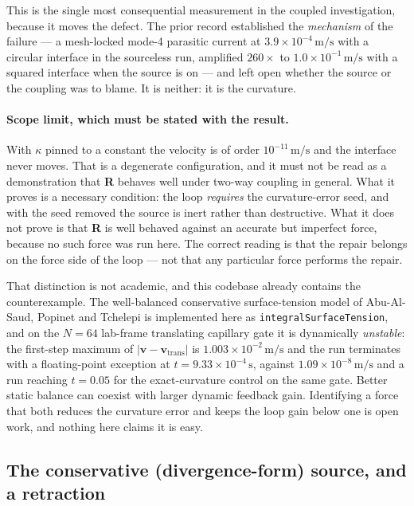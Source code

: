 \documentclass[preprint,3p,11pt]{elsarticle}
\begin{document}
This is the single most consequential measurement in the coupled investigation,
because it moves the defect. The prior record established the \emph{mechanism} of
the failure --- a mesh-locked mode-4 parasitic current at
$3.9\times10^{-4}\,\mathrm{m/s}$ with a circular interface in the sourceless run,
amplified $260\times$ to $1.0\times10^{-1}\,\mathrm{m/s}$ with a squared
interface when the source is on --- and left open whether the source or the
coupling was to blame. It is neither: it is the curvature.

\paragraph{Scope limit, which must be stated with the result.} With $\kappa$
pinned to a constant the velocity is of order $10^{-11}\,\mathrm{m/s}$ and the
interface never moves. That is a degenerate configuration, and it must not be
read as a demonstration that \textbf{R} behaves well under two-way coupling in
general. What it proves is a necessary condition: the loop \emph{requires} the
curvature-error seed, and with the seed removed the source is inert rather than
destructive. What it does not prove is that \textbf{R} is well behaved against an
accurate but imperfect force, because no such force was run here. The correct
reading is that the repair belongs on the force side of the loop --- not that any
particular force performs the repair.

That distinction is not academic, and this codebase already contains the
counterexample. The well-balanced conservative surface-tension model of
Abu-Al-Saud, Popinet and Tchelepi \cite{abualsaud2018} is implemented here as
\texttt{integralSurfaceTension}, and on the $N=64$ lab-frame translating
capillary gate it is dynamically \emph{unstable}: the first-step maximum of
$|\mathbf{v} - \mathbf{v}_{\mathrm{trans}}|$ is
$1.003\times10^{-2}\,\mathrm{m/s}$ and the run terminates with a
floating-point exception at $t = 9.33\times10^{-4}\,\mathrm{s}$, against
$1.09\times10^{-8}\,\mathrm{m/s}$ and a run reaching $t=0.05$ for the
exact-curvature control on the same gate. Better static balance can coexist with
larger dynamic feedback gain. Identifying a force that both reduces the curvature
error and keeps the loop gain below one is open work, and nothing here claims it
is easy.

\subsection{The conservative (divergence-form) source, and a retraction}
\label{sec:rdiv}
\end{document}
